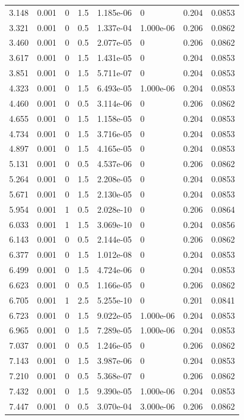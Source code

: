 \documentclass[preview]{standalone}
\begin{document}
{{\begin{tabular}{L{1.2cm}C{1.2cm} C{0.3cm}C{0.5cm} C{1.4cm}C{1.4cm} C{1.4cm}C{1.4cm}}
  3.148  &  0.001  & 0     & 1.5 &  1.185e-06  & 0  & 0.204 &  0.0853   \\ 
  3.321  &  0.001  & 0     & 0.5 &  1.337e-04  & 1.000e-06  & 0.206 &  0.0862   \\ 
  3.460  &  0.001  & 0     & 0.5 &  2.077e-05  & 0  & 0.206 &  0.0862   \\ 
  3.617  &  0.001  & 0     & 1.5 &  1.431e-05  & 0  & 0.204 &  0.0853   \\ 
  3.851  &  0.001  & 0     & 1.5 &  5.711e-07  & 0  & 0.204 &  0.0853   \\ 
  4.323  &  0.001  & 0     & 1.5 &  6.493e-05  & 1.000e-06  & 0.204 &  0.0853   \\ 
  4.460  &  0.001  & 0     & 0.5 &  3.114e-06  & 0  & 0.206 &  0.0862   \\ 
  4.655  &  0.001  & 0     & 1.5 &  1.158e-05  & 0  & 0.204 &  0.0853   \\ 
  4.734  &  0.001  & 0     & 1.5 &  3.716e-05  & 0  & 0.204 &  0.0853   \\ 
  4.897  &  0.001  & 0     & 1.5 &  4.165e-05  & 0  & 0.204 &  0.0853   \\ 
  5.131  &  0.001  & 0     & 0.5 &  4.537e-06  & 0  & 0.206 &  0.0862   \\ 
  5.264  &  0.001  & 0     & 1.5 &  2.208e-05  & 0  & 0.204 &  0.0853   \\ 
  5.671  &  0.001  & 0     & 1.5 &  2.130e-05  & 0  & 0.204 &  0.0853   \\ 
  5.954  &  0.001  & 1     & 0.5 &  2.028e-10  & 0  & 0.206 &  0.0864   \\ 
  6.033  &  0.001  & 1     & 1.5 &  3.069e-10  & 0  & 0.204 &  0.0856   \\ 
  6.143  &  0.001  & 0     & 0.5 &  2.144e-05  & 0  & 0.206 &  0.0862   \\ 
  6.377  &  0.001  & 0     & 1.5 &  1.012e-08  & 0  & 0.204 &  0.0853   \\ 
  6.499  &  0.001  & 0     & 1.5 &  4.724e-06  & 0  & 0.204 &  0.0853   \\ 
  6.623  &  0.001  & 0     & 0.5 &  1.166e-05  & 0  & 0.206 &  0.0862   \\ 
  6.705  &  0.001  & 1     & 2.5 &  5.255e-10  & 0  & 0.201 &  0.0841   \\ 
  6.723  &  0.001  & 0     & 1.5 &  9.022e-05  & 1.000e-06  & 0.204 &  0.0853   \\ 
  6.965  &  0.001  & 0     & 1.5 &  7.289e-05  & 1.000e-06  & 0.204 &  0.0853   \\ 
  7.037  &  0.001  & 0     & 0.5 &  1.246e-05  & 0  & 0.206 &  0.0862   \\ 
  7.143  &  0.001  & 0     & 1.5 &  3.987e-06  & 0  & 0.204 &  0.0853   \\ 
  7.210  &  0.001  & 0     & 0.5 &  5.368e-07  & 0  & 0.206 &  0.0862   \\ 
  7.432  &  0.001  & 0     & 1.5 &  9.390e-05  & 1.000e-06  & 0.204 &  0.0853   \\ 
  7.447  &  0.001  & 0     & 0.5 &  3.070e-04  & 3.000e-06  & 0.206 &  0.0862   \\ 
\hline 
\end{tabular} 

}}
\end{document}
